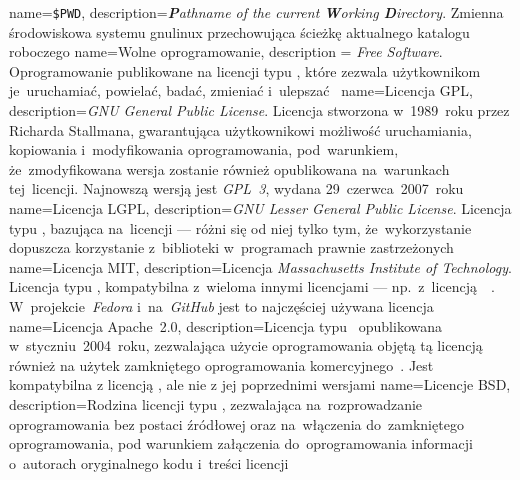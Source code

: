 {
	name={\texttt{\$PWD}},
	description={\emph{\textbf{P}athname of the current \textbf{W}orking \textbf{D}irectory}. Zmienna środowiskowa systemu \gls{gnulinux} przechowująca ścieżkę aktualnego katalogu roboczego}
}
{
	name={Wolne oprogramowanie},
	description = {\emph{Free Software}. Oprogramowanie publikowane na licencji typu , które zezwala użytkownikom je~uruchamiać, powielać, badać, zmieniać i~ulepszać~\cite{free-software}}
}
{
	name={Licencja GPL},
	description={\emph{GNU General Public License}. Licencja  stworzona w~1989~roku przez Richarda Stallmana, gwarantująca użytkownikowi możliwość uruchamiania, kopiowania i~modyfikowania oprogramowania, pod~warunkiem, że~zmodyfikowana wersja zostanie również opublikowana na~warunkach tej~licencji. Najnowszą wersją  jest \emph{GPL~3}, wydana 29~czerwca~2007~roku~\cite{gpl3,wiki:licenses-comparison}}
}
{
	name={Licencja LGPL},
	description={\emph{GNU Lesser General Public License}. Licencja typu , bazująca na~licencji  --- różni się od niej tylko tym, że~wykorzystanie  dopuszcza korzystanie z~biblioteki w~programach prawnie zastrzeżonych~\cite{lgpl3,why-not-lgpl,wiki:licenses-comparison}}
}
{
	name={Licencja MIT},
	description={Licencja \emph{Massachusetts Institute of Technology}. Licencja typu , kompatybilna z~wieloma innymi  licencjami --- np.~z~licencją~~\cite{mit}. W~projekcie~\emph{Fedora} i~na~\emph{GitHub} jest to najczęściej używana licencja~\cite{mit-popularity-fedora,mit-popularity-github,wiki:licenses-comparison}}
}
{
	name={Licencja Apache~2.0},
	description={Licencja typu ~opublikowana w~styczniu~2004~roku, zezwalająca użycie oprogramowania objętą tą licencją również na użytek zamkniętego oprogramowania komercyjnego~\cite{apache2.0,wiki:licenses-comparison}. Jest kompatybilna z licencją , ale nie z jej poprzednimi wersjami}
}
{
	name={Licencje BSD},
	description={Rodzina licencji typu , zezwalająca na~rozprowadzanie oprogramowania bez postaci źródłowej oraz na~włączenia do~zamkniętego oprogramowania, pod warunkiem załączenia do~oprogramowania informacji o~autorach oryginalnego kodu i~treści licencji~\cite{bsd,wiki:licenses-comparison}}
}
